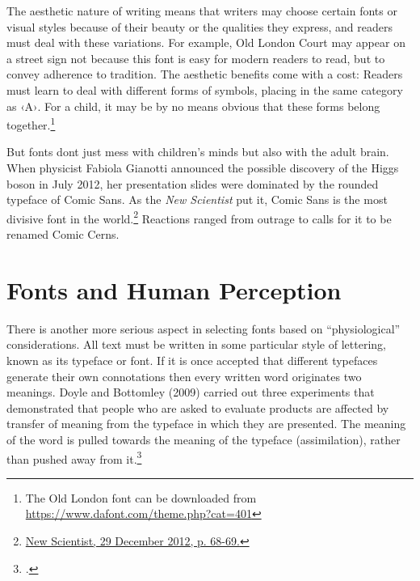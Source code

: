 The aesthetic nature of writing means that writers may choose certain fonts or visual styles because
of their beauty or the qualities they express, and
readers must deal with these variations. For example, {\oldlondon Old London Court} may appear on a street sign
not because this font is easy for modern readers to
read, but to convey adherence to tradition. The aesthetic benefits come with a cost: Readers must learn
to deal with different forms of symbols, placing
 in the same category as ‹A›. For a child, it may
be by no means obvious that these forms belong
together.\footnote{The Old London font can be downloaded from \protect\url{https://www.dafont.com/theme.php?cat=401}}

But fonts dont just mess with children's minds but also with the adult brain. When physicist Fabiola Gianotti announced the possible discovery of the Higgs boson in July 2012, her presentation slides were dominated by the rounded typeface of Comic Sans. As the \textit{New Scientist} put it, Comic Sans is the most divisive font in the world.\footnote{\protect\url{New Scientist, 29 December 2012, p. 68-69.}}  Reactions ranged from outrage to calls for it to be renamed Comic Cerns. 

\section*{Fonts and Human Perception}

There is another more serious aspect in selecting fonts based on \enquote{physiological} considerations. 
All text must be written in some particular style of lettering, known as its typeface or font. If it is once
accepted that different typefaces generate their own connotations then every written word originates
two meanings. Doyle and Bottomley (2009) carried out three experiments that demonstrated that people who are asked to evaluate products are affected by transfer of meaning from the typeface in which they are presented. The meaning of the word is pulled towards the meaning of the typeface (assimilation), rather than pushed away from it.\footcite{doyle2009}

